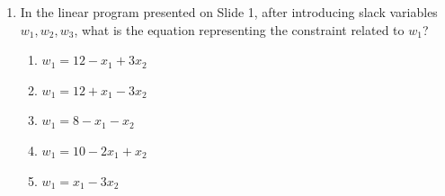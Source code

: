 \documentclass{article}%
\begin{document}
\begin{enumerate}
\begin{enumerate}
\end{enumerate}%
\vspace{1em}%
\item In the linear program presented on Slide 1, after introducing slack variables $w_1, w_2, w_3$, what is the equation representing the constraint related to $w_1$?%
\begin{enumerate}%
\item $w_1 = 12 - x_1 + 3x_2$%
\item $w_1 = 12 + x_1 - 3x_2$%
\item $w_1 = 8 - x_1 - x_2$%
\item $w_1 = 10 - 2x_1 + x_2$%
\item $w_1 = x_1 - 3x_2$%
\end{enumerate}%
\vspace{1em}%
\end{enumerate}

%
\newpage%
\end{document}
